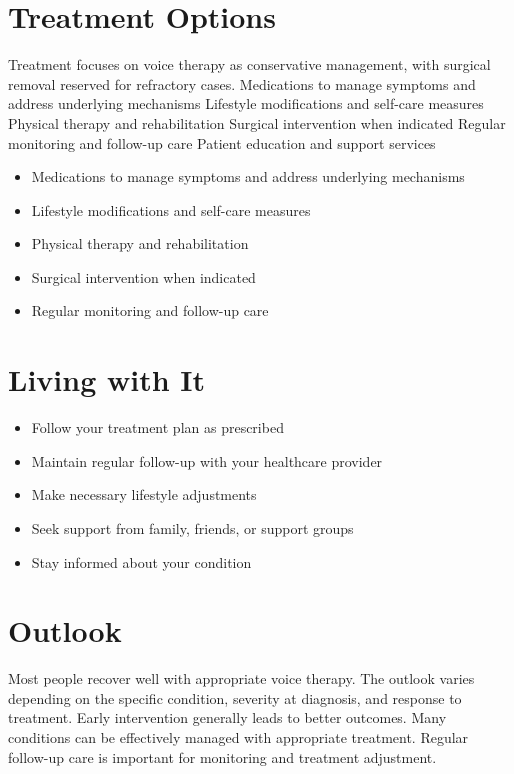 \section{Treatment Options}
Treatment focuses on voice therapy as conservative management, with surgical removal reserved for refractory cases. Medications to manage symptoms and address underlying mechanisms Lifestyle modifications and self-care measures Physical therapy and rehabilitation Surgical intervention when indicated Regular monitoring and follow-up care Patient education and support services

\begin{itemize}[noitemsep]
  \item Medications to manage symptoms and address underlying mechanisms
  \item Lifestyle modifications and self-care measures
  \item Physical therapy and rehabilitation
  \item Surgical intervention when indicated
  \item Regular monitoring and follow-up care
\end{itemize}
\section{Living with It}
\begin{itemize}[noitemsep]
  \item Follow your treatment plan as prescribed
  \item Maintain regular follow-up with your healthcare provider
  \item Make necessary lifestyle adjustments
  \item Seek support from family, friends, or support groups
  \item Stay informed about your condition
\end{itemize}
\section{Outlook}
Most people recover well with appropriate voice therapy. The outlook varies depending on the specific condition, severity at diagnosis, and response to treatment. Early intervention generally leads to better outcomes. Many conditions can be effectively managed with appropriate treatment. Regular follow-up care is important for monitoring and treatment adjustment.
